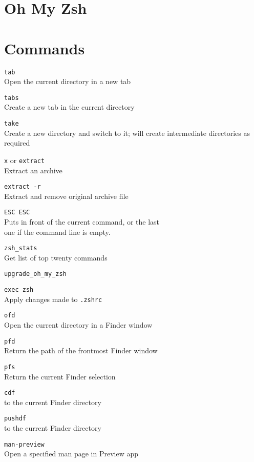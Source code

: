 \documentclass[a4paper,landscape,columns=3]{cheatsheet}
\begin{document}
\sffamily

\section{Oh My Zsh}

\bigskip

\section{Commands}

\texttt{tab}\\
Open the current directory in a new tab

\texttt{tabs}\\
Create a new tab in the current directory

\texttt{take}\\
Create a new directory and switch to it; will create intermediate directories as required

\texttt{x} or \texttt{extract}\\
Extract an archive

\texttt{extract -r}\\
Extract and remove original archive file

\texttt{ESC ESC}\\
Puts {} in front of the current command, or the last\\ one if the command line is empty.

\texttt{zsh\_stats}\\
Get list of top twenty commands

\texttt{upgrade\_oh\_my\_zsh}

\texttt{exec zsh}\\
Apply changes made to \texttt{.zshrc}

\texttt{ofd}\\
 Open the current directory in a Finder window

\texttt{pfd}\\
 Return the path of the frontmost Finder window

\texttt{pfs}\\
 Return the current Finder selection

\texttt{cdf }\\
{} to the current Finder directory

\texttt{pushdf}\\
{} to the current Finder directory

\texttt{man-preview}\\
 Open a specified man page in Preview app
\end{document}
